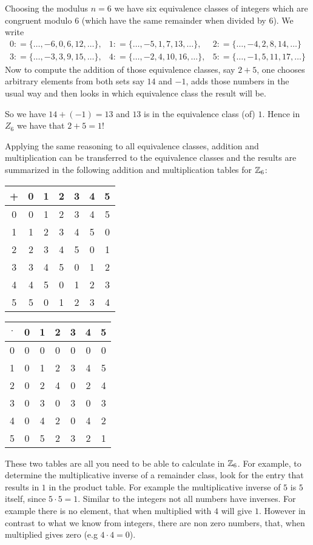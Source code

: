 \begin{example} 
\label{z_6}
Choosing the modulus $ n = 6 $ we have six equivalence classes of integers which are congruent modulo $ 6 $ (which have the same remainder when divided by $6$). We write
$$
\begin{array}{lll}
0: = \{\ldots, -6,0,6,12, \ldots \}, &
1: = \{\ldots, -5,1,7,13, \ldots \}, &
2: = \{\ldots, -4,2,8,14, \ldots \} \\
3: = \{\ldots, -3,3,9,15, \ldots \}, &
4: = \{\ldots, -2,4,10,16, \ldots \}, &
5: = \{\ldots, -1,5,11,17, \ldots \}
\end{array}
$$
Now to compute the addition of those equivalence classes, say $2+5$, one chooses arbitrary elements from both sets say $14$ and $-1$, adds those numbers in the usual way and then looks in which equivalence class the result will be. 

So we have $14+(-1)=13$ and $13$ is in the equivalence class (of) $1$. Hence in $Z_6$ we have that $2+5=1$!

Applying the same reasoning to all equivalence classes, addition and multiplication can  be transferred to the equivalence classes and the results are summarized in the following addition and multiplication tables for $ \mathbb{Z}_6 $:
\begin{center}
  \begin{tabular}{c | c c c c c c}
    + & 0 & 1 & 2 & 3 & 4 & 5\\\hline
    0 & 0 & 1 & 2 & 3 & 4 & 5 \\
    1 & 1 & 2 & 3 & 4 & 5 & 0\\
    2 & 2 & 3 & 4 & 5 & 0 & 1\\
    3 & 3 & 4 & 5 & 0 & 1 & 2\\
    4 & 4 & 5 & 0 & 1 & 2 & 3\\
    5 & 5 & 0 & 1 & 2 & 3 & 4
  \end{tabular} \quad \quad \quad \quad
  \begin{tabular}{c | c c c c c c}
$ \cdot $ & 0 & 1 & 2 & 3 & 4 & 5 \\\hline
        0 & 0 & 0 & 0 & 0 & 0 & 0\\
        1 & 0 & 1 & 2 & 3 & 4 & 5\\
        2 & 0 & 2 & 4 & 0 & 2 & 4\\
        3 & 0 & 3 & 0 & 3 & 0 & 3\\
        4 & 0 & 4 & 2 & 0 & 4 & 2\\
        5 & 0 & 5 & 2 & 3 & 2 & 1
  \end{tabular}
\end{center}

These two tables are all you need to be able to calculate in $ \mathbb{Z}_6 $. For example, to determine the multiplicative inverse of a remainder class, look for the entry that results in $ 1 $ in the product table. For example the multiplicative inverse of $ 5 $ is $ 5 $ itself, since $5\cdot 5 = 1$. Similar to the integers not all numbers have inverses. For example there is no element, that when multiplied with $4$ will give $1$. 
However in contrast to what we know from integers, there are non zero numbers, that, when multiplied gives zero (e.g $4\cdot 4 =0$).
\end{example}

